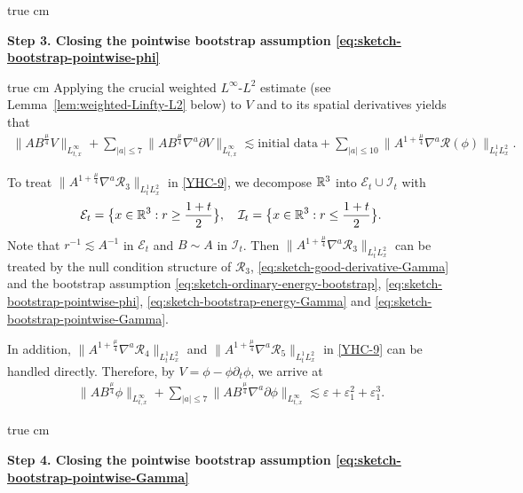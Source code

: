 \documentclass[11pt,twoside]{article}
\def\R{\mathop{\mathbb R\kern 0pt}\nolimits}
\def\f{\frac}
\def\p{\partial}
\def\ls{\lesssim}
\theoremstyle{plain}
\theoremstyle{definition}
\theoremstyle{assumption}
\numberwithin{equation}{section}
\begin{document}
 true cm
	
{\bf Step 3. Closing the pointwise bootstrap assumption \eqref{eq:sketch-bootstrap-pointwise-phi}}

 true cm
Applying the crucial weighted $L^{\infty}$-$L^2$ estimate (see Lemma~\ref{lem:weighted-Linfty-L2} below) to \(V\)
and to its spatial derivatives yields that
\begin{equation}\label{YHC-9}
	\begin{aligned}
		\|AB^{\frac{\mu}{4}}V\|_{L^\infty_{t,x}}
		+\sum_{|a|\le 7}\big\|AB^{\frac{\mu}{4}}
		\nabla^a\p V\big\|_{L^\infty_{t,x}}
		\ls \text{initial data}
		+\sum_{|a|\le 10}\big\|A^{1+\frac{\mu}{4}}\nabla^a\mathcal R(\phi)\big\|_{L^1_tL^2_x}.
	\end{aligned}
\end{equation}

To treat $\big\|A^{1+\frac{\mu}{4}}\nabla^a\mathcal R_3\big\|_{L^1_tL^2_x}$ in \eqref{YHC-9}, we decompose
$\Bbb R^3$ into $\mathcal E_t\cup \mathcal I_t$ with
\begin{equation*}
	\mathcal E_t=\big\{x\in\R^3:r\ge \f{1+t}{2}\big\}, \quad \mathcal I_t=\big\{x\in\R^3:r\le \f{1+t}{2}\big\}.
\end{equation*}
Note that $r^{-1}\ls A^{-1}$ in $\mathcal{E}_t$ and $B \sim A$ in $\mathcal{I}_t$.
Then $\big\|A^{1+\frac{\mu}{4}}\nabla^a\mathcal R_3\big\|_{L^1_tL^2_x}$ can be treated
by the null condition structure of $\mathcal R_3$, \eqref{eq:sketch-good-derivative-Gamma} and
the bootstrap assumption \eqref{eq:sketch-ordinary-energy-bootstrap}, \eqref{eq:sketch-bootstrap-pointwise-phi}, \eqref{eq:sketch-bootstrap-energy-Gamma} and \eqref{eq:sketch-bootstrap-pointwise-Gamma}.

In addition, $\big\|A^{1+\frac{\mu}{4}}\nabla^a\mathcal R_4\big\|_{L^1_tL^2_x}$
and $\big\|A^{1+\frac{\mu}{4}}\nabla^a\mathcal R_5\big\|_{L^1_tL^2_x}$ in \eqref{YHC-9}
can be handled directly. Therefore, by \(V=\phi-\phi\partial_t\phi\), we arrive at
\begin{equation}\label{YHC-10}
	\begin{aligned}
\big\|
AB^{\frac{\mu}{4}}\phi
\big\|_{L^\infty_{t,x}}
+\sum_{|a|\le 7}
\big\|AB^{\frac{\mu}{4}}\nabla^a\partial\phi
\big\|_{L^\infty_{t,x}}
\lesssim
\varepsilon+\varepsilon_1^2+\varepsilon_1^3.
\end{aligned}
\end{equation}


 true cm
	
{\bf Step 4.  Closing the pointwise bootstrap assumption \eqref{eq:sketch-bootstrap-pointwise-Gamma}}
\end{document}
